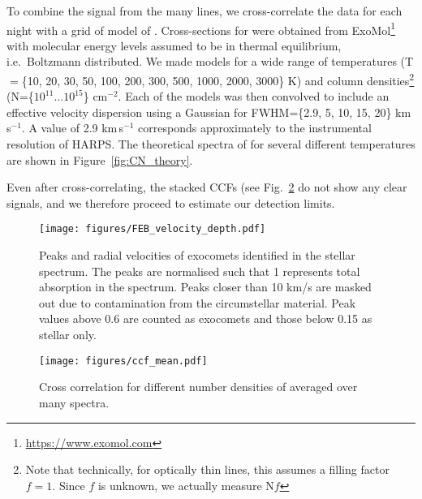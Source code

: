 \documentclass{aa}
\begin{document}
To combine the signal from the many  lines, we cross-correlate the data for each night with a grid of model of .
%
Cross-sections for  were obtained from ExoMol\footnote{\url{https://www.exomol.com}} \citep{Tennyson12,Tennyson16,Brooke14} with molecular energy levels assumed to be in thermal equilibrium, i.e.\ Boltzmann distributed.
%
We made models for a wide range of temperatures (T$=$\{10, 20, 30, 50, 100, 200, 300, 500, 1000, 2000, 3000\} K) and column densities\footnote{Note that technically, for optically thin lines, this assumes a filling factor $f=1$.
%
Since $f$ is unknown, we actually measure N$f$} (N=\{$10^{11} \ldots 10^{15}$\} cm$^{-2}$.
%
Each of the models was then convolved to include an effective velocity dispersion using a Gaussian for FWHM=\{2.9, 5, 10, 15, 20\} km\,s$^{-1}$.
%
A value of 2.9 km\,s$^{-1}$ corresponds approximately to the instrumental resolution of HARPS.
%
The theoretical spectra of  for several different temperatures are shown in Figure~\ref{fig:CN_theory}.

Even after cross-correlating, the stacked CCFs (see Fig.~\ref{fig:ccf_mean} do not show any clear signals, and we therefore proceed to estimate our detection limits.

\begin{figure}
    \begin{centering}
        \texttt{[image: figures/FEB\_velocity\_depth.pdf]}
        \caption{Peaks and radial velocities of exocomets identified in the stellar spectrum.
        The peaks are normalised such that 1 represents total absorption in the spectrum.
        Peaks closer than 10 km/s are masked out due to contamination from the circumstellar material.
        Peak values above 0.6 are counted as exocomets and those below 0.15 as stellar only.}
        \label{fig:FEB_velocity}
    \end{centering}
\end{figure}


\begin{figure}
    \begin{centering}
        \texttt{[image: figures/ccf\_mean.pdf]}
        \caption{Cross correlation for different number densities of  averaged over many spectra.}
        \label{fig:ccf_mean}
    \end{centering}
\end{figure}
\end{document}
